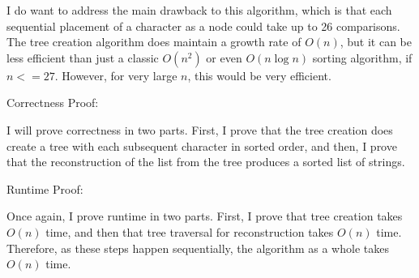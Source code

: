 \documentclass[11pt]{article}
\begin{document}
I do want to address the main drawback to this algorithm, which is that each sequential placement of a character as a node could take up to 26 comparisons. 
The tree creation algorithm does maintain a growth rate of $O(n)$, but it can be less efficient than just a classic $O(n^2)$ or even $O(n \log n)$ sorting algorithm, 
if $n <= 27$. However, for very large $n$, this would be very efficient.

\bigbreak

Correctness Proof:

I will prove correctness in two parts. First, I prove that the tree creation does create a tree with each subsequent character in sorted order, 
and then, I prove that the reconstruction of the list from the tree produces a sorted list of strings. 

\bigbreak

Runtime Proof:

Once again, I prove runtime in two parts. First, I prove that tree creation takes $O(n)$ time, and then that tree traversal for reconstruction 
takes $O(n)$ time. Therefore, as these steps happen sequentially, the algorithm as a whole takes $O(n)$ time.
\end{document}
